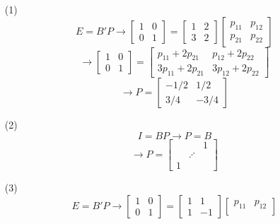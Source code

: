 %
%
\begin{itemize}
\item[(1)]
$$E = B'P \rightarrow \begin{bmatrix}
1 & 0 \\
0 & 1
\end{bmatrix} = \begin{bmatrix}
1 & 2 \\
3 & 2
\end{bmatrix}\begin{bmatrix}
p_{11} & p_{12} \\
p_{21} & p_{22}
\end{bmatrix}$$
$$\rightarrow \begin{bmatrix}
1 & 0 \\
0 & 1
\end{bmatrix} = \begin{bmatrix}
p_{11} + 2p_{21} & p_{12} + 2p_{22} \\
3p_{11} + 2p_{21} & 3p_{12} + 2p_{22}
\end{bmatrix}$$
$$\rightarrow P = \begin{bmatrix}
-1/2 & 1/2 \\
3/4 & -3/4
\end{bmatrix}$$
\item[(2)]
$$I = BP \rightarrow P = B$$
$$\rightarrow P = \begin{bmatrix}
& & 1 \\
& \iddots \\
1
\end{bmatrix}$$
\item[(3)]
$$E = B'P \rightarrow \begin{bmatrix}
1 & 0 \\
0 & 1
\end{bmatrix} = \begin{bmatrix}
1 & 1 \\
1 & -1
\end{bmatrix}\begin{bmatrix}
p_{11} & p_{12} \\

\end{bmatrix}$$
\end{itemize}
